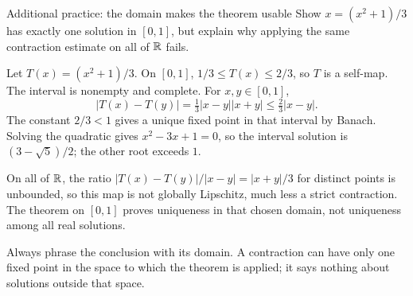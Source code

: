 \begin{exam}{Additional practice: the domain makes the theorem usable}
Show $x=(x^2+1)/3$ has exactly one solution in $[0,1]$, but explain why applying the same contraction estimate on all of $\mathbb R$ fails.
\end{exam}
\begin{answer}
Let $T(x)=(x^2+1)/3$. On $[0,1]$, $1/3\le T(x)\le2/3$, so $T$ is a self-map. The interval is nonempty and complete. For $x,y\in[0,1]$,
\[|T(x)-T(y)|=\tfrac13|x-y||x+y|\le\tfrac23|x-y|.\]
The constant $2/3<1$ gives a unique fixed point in that interval by Banach. Solving the quadratic gives $x^2-3x+1=0$, so the interval solution is $(3-\sqrt5)/2$; the other root exceeds $1$.

On all of $\mathbb R$, the ratio $|T(x)-T(y)|/|x-y|=|x+y|/3$ for distinct points is unbounded, so this map is not globally Lipschitz, much less a strict contraction. The theorem on $[0,1]$ proves uniqueness in that chosen domain, not uniqueness among all real solutions.
\end{answer}
\begin{tip}
Always phrase the conclusion with its domain. A contraction can have only one fixed point in the space to which the theorem is applied; it says nothing about solutions outside that space.
\end{tip}


